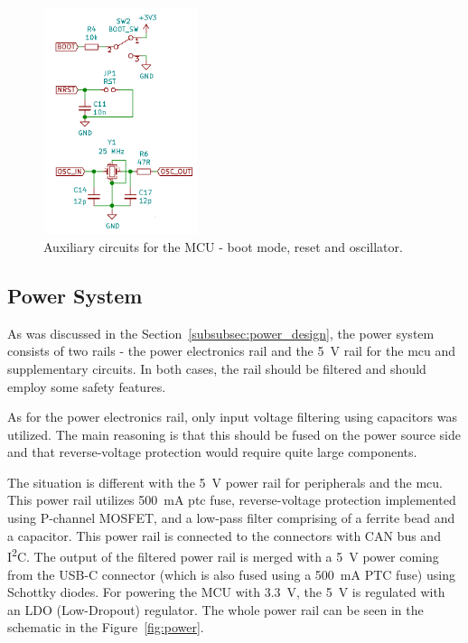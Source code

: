 \begin{figure}[H]
    \centering
    \includegraphics[width=0.4\textwidth]{obrazky/schem_mcu_aux}
    \caption{Auxiliary circuits for the MCU - boot mode, reset and oscillator.}
    \label{fig:schem_mcu_aux}
\end{figure}

\subsection{Power System}
\label{subsec:power_system}
As was discussed in the Section~\ref{subsubsec:power_design}, the power system consists of two rails - the power electronics rail and the 5~V rail for the \acs{mcu} and supplementary circuits.
In both cases, the rail should be filtered and should employ some safety features.

As for the power electronics rail, only input voltage filtering using capacitors was utilized.
The main reasoning is that this should be fused on the power source side and that reverse-voltage protection would require quite large components.

The situation is different with the 5~V power rail for peripherals and the \acs{mcu}.
This power rail utilizes 500~mA \acs{ptc} fuse, reverse-voltage protection implemented using P-channel MOSFET, and a low-pass filter comprising of a ferrite bead and a capacitor.
This power rail is connected to the connectors with CAN bus and I\textsuperscript{2}C.
The output of the filtered power rail is merged with a 5~V power coming from the USB-C connector (which is also fused using a 500~mA PTC fuse) using Schottky diodes.
For powering the MCU with 3.3~V, the 5~V is regulated with an LDO (Low-Dropout) regulator.
The whole power rail can be seen in the schematic in the Figure~\ref{fig:power}.

